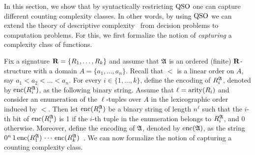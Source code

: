 
In this section, we show that by syntactically restricting ${\rm QSO}$ one can capture different counting complexity classes. 
In other words, by using ${\rm QSO}$ we can extend the theory of descriptive complexity~\cite{immerman1999descriptive} from decision problems to computation problems. 
For this, we first formalize the notion of \emph{capturing} a complexity class of functions.

Fix a signature $\mathbf{R} = \{R_1, \ldots, R_k\}$ and assume that $\mathfrak{A}$ is an ordered (finite) $\mathbf{R}$-structure with a domain $A = \{a_1, \ldots, a_n\}$.
Recall that  $<$ is a linear order on $A$, say $a_1 < a_2 < \ldots < a_n$. For every $i \in \{1, \ldots, k\}$, define the encoding of $R_i^{\mathfrak{A}}$, denoted by ${\rm enc}(R_i^{\mathfrak{A}})$, as the following binary string. Assume that $\ell = {\rm arity}(R_i)$ and consider an enumeration of the $\ell$-tuples over $A$ in the lexicographic order induced by $<$. 
Then let ${\rm enc}(R_i^{\mathfrak{A}})$ be a binary string of length $n^\ell$ such that the $i$-th bit of ${\rm enc}(R_i^{\mathfrak{A}})$ is 1 if the $i$-th tuple in the enumeration belongs to $R_i^{\mathfrak{A}}$, and 0 otherwise. Moreover, define the encoding of $\mathfrak{A}$, denoted by ${\rm enc}(\mathfrak{A})$, as the string
$0^n \, 1 \, {\rm enc}(R_1^{\mathfrak{A}}) \, \cdots \, {\rm enc}(R_k^{\mathfrak{A}})$~\cite{L04}. 
We can now formalize the notion of capturing a counting complexity class. 
